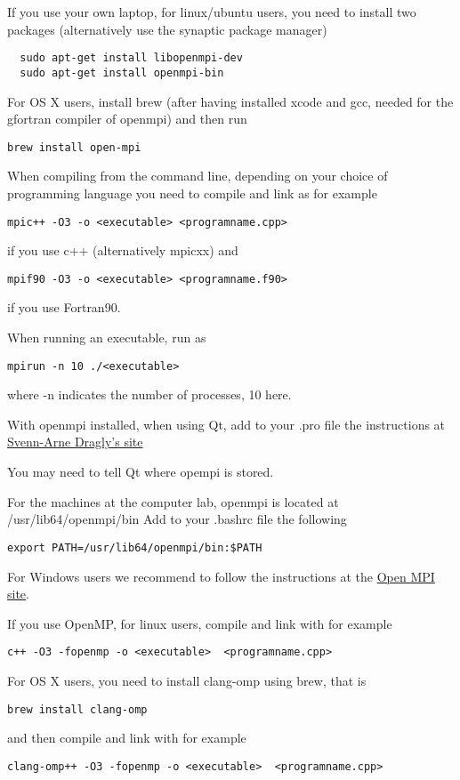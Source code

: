 \documentclass[10pt,showpacs,preprintnumbers,footinbib,amsmath,amssymb,aps,prl,twocolumn,groupedaddress,superscriptaddress,showkeys]{revtex4-1}
\begin{document}
If you use your own laptop, for linux/ubuntu users, you need to install two packages (alternatively use the synaptic package manager)
\begin{verbatim}
  sudo apt-get install libopenmpi-dev
  sudo apt-get install openmpi-bin
\end{verbatim}
For OS X users, install brew (after having installed xcode and gcc, needed for the 
gfortran compiler of openmpi) and then run
\begin{verbatim}
brew install open-mpi
\end{verbatim}
When compiling from the command line, depending on your choice of programming language you need to compile and link as for example
\begin{verbatim}
mpic++ -O3 -o <executable> <programname.cpp>
\end{verbatim}
if you use c++ (alternatively mpicxx) and
\begin{verbatim}
mpif90 -O3 -o <executable> <programname.f90>
\end{verbatim}
if you use Fortran90.

When running an executable, run as
\begin{verbatim}
mpirun -n 10 ./<executable>
\end{verbatim}
where -n indicates the number of processes, 10 here.

With openmpi installed, when using Qt, add to your .pro file the instructions at \href{{http://dragly.org/2012/03/14/developing-mpi-applications-in-qt-creator/}}{Svenn-Arne Dragly's site}

You may need to tell Qt where opempi is stored.

For the machines at the computer lab, openmpi is located  at /usr/lib64/openmpi/bin
Add to your .bashrc file the following
\begin{verbatim}
export PATH=/usr/lib64/openmpi/bin:$PATH 
\end{verbatim}
For Windows users we recommend to follow the instructions at the \href{{https://www.open-mpi.org/software/ompi/v1.6/ms-windows.php}}{Open MPI site}.

If you use OpenMP, for linux users, compile and link with for example
\begin{verbatim}
c++ -O3 -fopenmp -o <executable>  <programname.cpp>
\end{verbatim}
For OS X users, you need to install clang-omp using brew, that is
\begin{verbatim}
brew install clang-omp
\end{verbatim}
and then compile and link with for example
\begin{verbatim}
clang-omp++ -O3 -fopenmp -o <executable>  <programname.cpp>
\end{verbatim}
\end{document}
